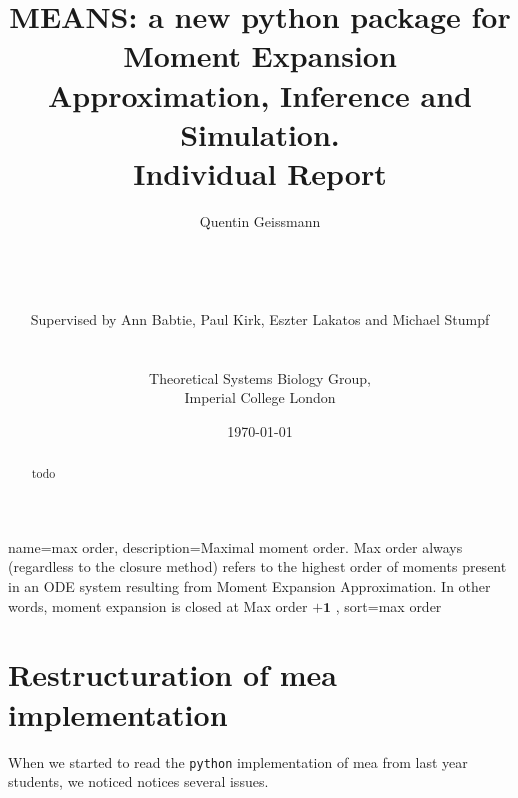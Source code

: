 \documentclass[11pt,a4paper]{article}
\newcommand{\py}{\texttt{python}}
\begin{document}
\listoftodos
\newpage

\title{MEANS: a new python package for Moment Expansion Approximation, Inference and Simulation.\\
Individual Report}
\author{Quentin Geissmann\\
\\	
\\
\\
\\
Supervised by Ann Babtie, Paul Kirk, Eszter Lakatos and Michael Stumpf\\
\\
\\
Theoretical Systems Biology Group,\\
Imperial College London
}
\date{\today}

\clearpage\maketitle
\thispagestyle{empty}
\newpage{}


\begin{abstract}
todo 
\end{abstract}

\tableofcontents


{
  name=max order,
  description={Maximal moment order. Max order always (regardless to the closure method) refers to the highest order of 
  moments present in an ODE system resulting from Moment Expansion Approximation. In other words, moment expansion is closed at Max order $\mathbf{+1}$
   },
  sort=max order
}

\newpage{}

\section{Restructuration of \acrlong{mea} implementation}
When we started to read the \py{} implementation of \acrshort{mea} from last year students\cite{babtie_moment_2013},
we noticed notices several issues.
\end{document}

